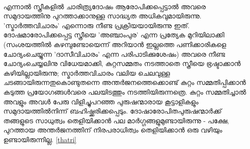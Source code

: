 \paragraph{}എന്നാൽ സ്ത്രീകളിൽ ചാരിത്ര്യദോഷം ആരോപിക്കപ്പെട്ടാൽ അവരെ സമുദായത്തിനു പുറത്താക്കാനുള്ള സാദ്ധ്യത അധികവുമായിരുന്നു. 'സ്മാർത്തവിചാരം' എന്നൊരു നീണ്ട പ്രക്രിയയായിരുന്നു ഇത്. ദോഷമാരോപിക്കപ്പെട്ട സ്ത്രീയെ 'അഞ്ചാംപുര' എന്ന പ്രത്യേക മുറിയിലാക്കി (സംശയത്തിൽ കഴമ്പുണ്ടോയെന്ന് അറിയാൻ ഇല്ലത്തെ പണിക്കാരികളെ ചോദ്യംചെയ്യുന്ന 'ദാസീവിചാരം' എന്ന പരിപാടിക്കുശേഷം) അവരെ നീണ്ട ചോദ്യംചെയ്യലിനു വിധേയമാക്കി, കുറ്റസമ്മതം നടത്താതെ സ്ത്രീയെ ഭ്രഷ്ടാക്കാൻ കഴിയില്ലായിരുന്നു; സ്മാർത്തവിചാരം വലിയ ചെലവുള്ള ചടങ്ങായിരുന്നതുകൊണ്ടുതന്നെ അന്തർജനത്തെക്കൊണ്ട് കുറ്റം സമ്മതിപ്പിക്കാൻ കടുത്ത പ്രയോഗങ്ങൾവരെ പലയിടത്തും നടത്തിയിരുന്നത്രെ. കുറ്റം സമ്മതിച്ചാൽ അവളും അവൾ പേരു വിളിച്ചുപറഞ്ഞ പുരുഷന്മാരായ കൂട്ടാളികളും സമുദായത്തിൽനിന്ന് ബഹിഷ്ക്കരിക്കപ്പെടും. ദോഷാരോപിതപുരുഷന്മാർക്ക് തങ്ങളുടെ സാധുത്വം തെളിയിക്കാൻ പല മാർഗ്ഗങ്ങളുമുണ്ടായിരുന്നു - പക്ഷേ, പുറത്തായ അന്തർജനത്തിന് നിരപരാധിത്വം തെളിയിക്കാൻ ഒരു വഴിയും ഉണ്ടായിരുന്നില്ല. \ref{thatri}

